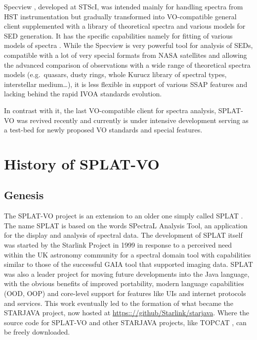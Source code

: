 \documentclass[final,authoryear,5p,times,twocolumn]{elsarticle}
\begin{document}
Specview \citep[][]{2002SPIE.4847..410B}, developed at STScI,
was intended mainly for handling spectra from HST instrumentation but
gradually transformed into VO-compatible general client supplemented with a
library of theoretical spectra and various models for SED generation.  It has
the specific capabilities namely for fitting of various models of spectra .
While the Specview is very powerful tool for analysis of SEDs, compatible with
a lot of very special formats from NASA satellites and allowing the advanced
comparison of observations with a wide range of theoretical spectra models
(e.g.\ quasars, dusty rings, whole Kurucz library of spectral types,
interstellar medium\ldots), it is less flexible in support of various SSAP
features and lacking behind the rapid IVOA standards evolution.

In contrast with it, the last VO-compatible client for spectra
analysis, SPLAT-VO \citep[][]{sun243} was revived
recently and currently is under intensive development serving as a
test-bed for newly proposed VO standards and special features.




\section{History of SPLAT-VO}
\subsection{Genesis}

The SPLAT-VO project is an extension to an older one simply called
SPLAT \citep[][]{2002ASPC..281..513B}.  The name SPLAT
is based on the words SPectraL Analysis Tool, an application for the
display and analysis of spectral data. The development of SPLAT itself
was started by the Starlink Project \citep{1982QJRAS..23..485D} in
1999 in response to a perceived need within the UK astronomy community
for a spectral domain tool with capabilities similar to those of the
successful GAIA tool \citep[][]{2000ASPC..216..615D}
that supported imaging data. SPLAT was also a leader project for
moving future developments into the Java language, with the obvious
benefits of improved portability, modern language capabilities (OOD,
OOP) and core-level support for features like UIs and internet
protocols and services. This work eventually led to the formation of
what became the STARJAVA project, now hosted at
\url{https:://github/Starlink/starjava}. Where the source code for
SPLAT-VO and other STARJAVA projects, like TOPCAT
\citep[][]{2005ASPC..347...29T}, can be freely
downloaded.
\end{document}
